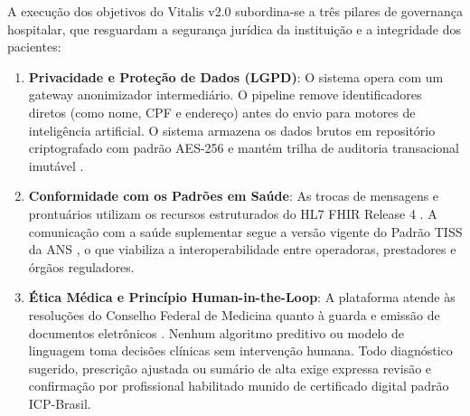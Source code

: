 A execução dos objetivos do Vitalis v2.0 subordina-se a três pilares de governança hospitalar, que resguardam a segurança jurídica da instituição e a integridade dos pacientes:

\begin{enumerate}[leftmargin=*]
    \item \textbf{Privacidade e Proteção de Dados (LGPD)}: O sistema opera com um gateway anonimizador intermediário. O pipeline remove identificadores diretos (como nome, CPF e endereço) antes do envio para motores de inteligência artificial. O sistema armazena os dados brutos em repositório criptografado com padrão AES-256 e mantém trilha de auditoria transacional imutável \cite{brasil_lgpd:2018}.
    \item \textbf{Conformidade com os Padrões em Saúde}: As trocas de mensagens e prontuários utilizam os recursos estruturados do HL7 FHIR Release 4 \cite{hl7_fhir:2019}. A comunicação com a saúde suplementar segue a versão vigente do Padrão TISS da ANS \cite{ans_tiss:2023}, o que viabiliza a interoperabilidade entre operadoras, prestadores e órgãos reguladores.
    \item \textbf{Ética Médica e Princípio Human-in-the-Loop}: A plataforma atende às resoluções do Conselho Federal de Medicina quanto à guarda e emissão de documentos eletrônicos \cite{cfm_prontuario:2007,cfm_digital:2021}. Nenhum algoritmo preditivo ou modelo de linguagem toma decisões clínicas sem intervenção humana. Todo diagnóstico sugerido, prescrição ajustada ou sumário de alta exige expressa revisão e confirmação por profissional habilitado munido de certificado digital padrão ICP-Brasil.
\end{enumerate}
